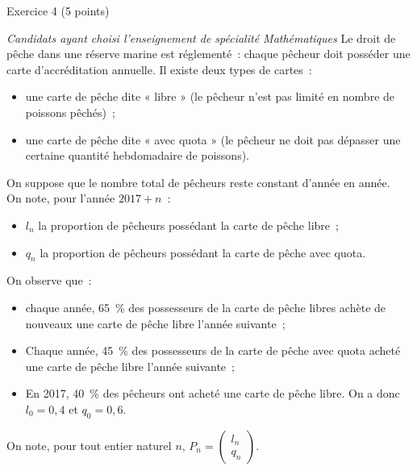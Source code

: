 
\begin{h2}Exercice 4 (5 points)\end{h2}
\smallbreak
\textit{Candidats ayant choisi l'enseignement de spécialité \og Mathématiques \fg{} }
\bigbreak
Le droit de pêche dans une réserve marine est réglementé~: chaque pêcheur doit posséder une carte d'accréditation annuelle. Il existe deux types de cartes~:
\begin{itemize}
     \item une carte de pêche dite « libre » (le pêcheur n'est pas limité en nombre de poissons pêchés)~;
     \item une carte de pêche dite « avec quota » (le pêcheur ne doit pas dépasser une certaine quantité hebdomadaire de poissons).
\end{itemize}
On suppose que le nombre total de pêcheurs reste constant d'année en année.\\
On note, pour l'année $2017+n$~:
\begin{itemize}
     \item $l_n$ la proportion de pêcheurs possédant la carte de pêche libre~;
     \item $q_n$ la proportion de pêcheurs possédant la carte de pêche avec quota.
\end{itemize}
On observe que~:
\begin{itemize}
     \item chaque année, 65~\% des possesseurs de la carte de pêche libres achète de nouveaux une carte de pêche libre l'année suivante~;
     \item Chaque année, 45~\% des possesseurs de la carte de pêche avec quota acheté une carte de pêche libre l'année suivante~;
     \item En 2017, 40~\% des pêcheurs ont acheté une carte de pêche libre. On a donc $l_0=0,4$ et $q_0=0,6$.
\end{itemize}
On note, pour tout entier naturel $n$, $P_n=\begin{pmatrix}
     l_n\\q_n
\end{pmatrix}$.
